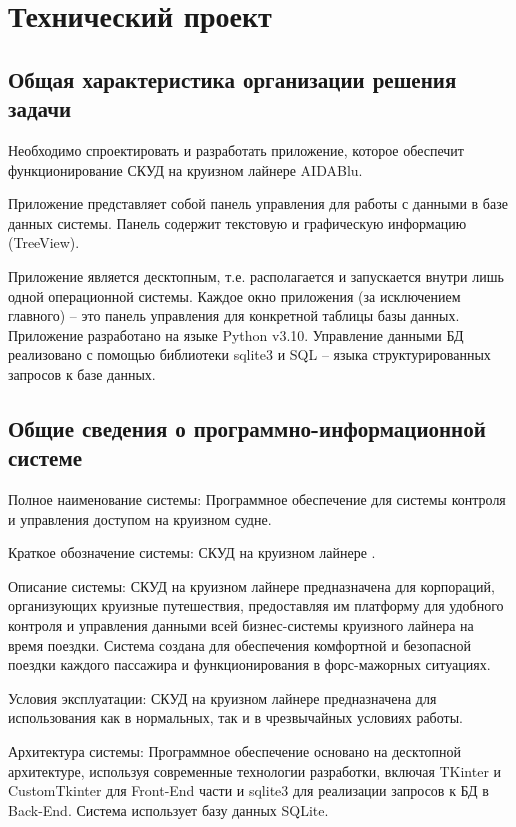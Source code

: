 \section{Технический проект}
\subsection{Общая характеристика организации решения задачи}

Необходимо спроектировать и разработать приложение, которое обеспечит функционирование СКУД на круизном лайнере AIDABlu.

Приложение представляет собой панель управления для работы с данными в базе данных системы. Панель содержит текстовую и графическую информацию (TreeView).

Приложение является десктопным, т.е. располагается и запускается внутри лишь одной операционной системы. Каждое окно приложения (за исключением главного) – это панель управления для конкретной таблицы базы данных. Приложение разработано на языке Python v3.10. Управление данными БД реализовано с помощью библиотеки sqlite3 и SQL -- языка структурированных запросов к базе данных.

\subsection{Общие сведения о программно-информационной системе}

Полное наименование системы: Программное обеспечение для системы контроля и управления доступом на круизном судне.

Краткое обозначение системы: \textquotedbl СКУД на круизном лайнере \textquotedbl.

Описание системы: \textquotedbl СКУД на круизном лайнере \textquotedbl предназначена для корпораций, организующих круизные путешествия, предоставляя им платформу для удобного контроля и управления данными всей бизнес-системы круизного лайнера на время поездки. Система создана для обеспечения комфортной и безопасной поездки каждого пассажира и функционирования в форс-мажорных ситуациях.

Условия эксплуатации: \textquotedbl СКУД на круизном лайнере \textquotedbl предназначена для использования как в нормальных, так и в чрезвычайных условиях работы.

Архитектура системы: Программное обеспечение основано на десктопной архитектуре, используя современные технологии разработки, включая TKinter и CustomTkinter для Front-End части и sqlite3 для реализации запросов к БД в Back-End. Система использует базу данных SQLite.

